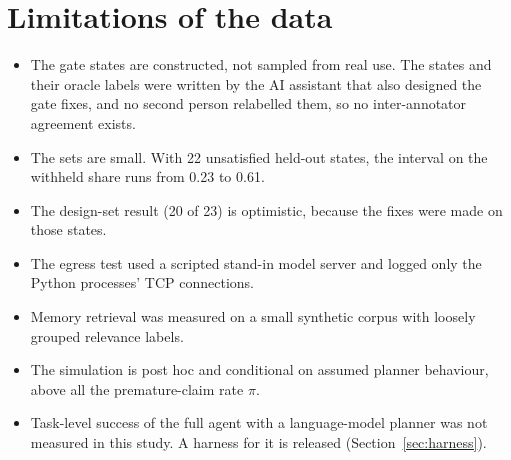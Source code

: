 \section{Limitations of the data}

\begin{itemize}
\item The gate states are constructed, not sampled from real use. The states and their oracle labels were written by the AI assistant that also designed the gate fixes, and no second person relabelled them, so no inter-annotator agreement exists.
\item The sets are small. With 22 unsatisfied held-out states, the interval on the withheld share runs from 0.23 to 0.61.
\item The design-set result (20 of 23) is optimistic, because the fixes were made on those states.
\item The egress test used a scripted stand-in model server and logged only the Python processes' TCP connections.
\item Memory retrieval was measured on a small synthetic corpus with loosely grouped relevance labels.
\item The simulation is post hoc and conditional on assumed planner behaviour, above all the premature-claim rate $\pi$.
\item Task-level success of the full agent with a language-model planner was not measured in this study. A harness for it is released (Section~\ref{sec:harness}).
\end{itemize}
